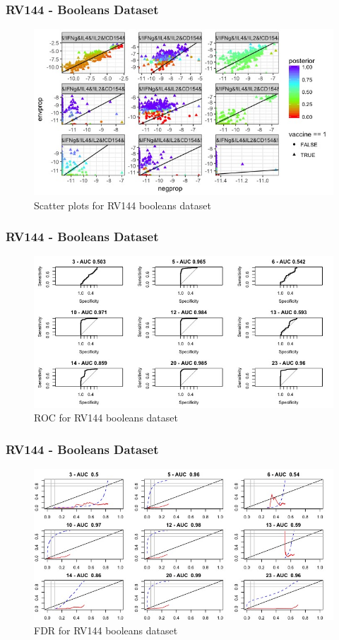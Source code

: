 \documentclass{beamer}
\theoremstyle{definition}
\begin{document}

\begin{frame}
\frametitle{RV144 - Booleans Dataset}
\begin{figure}[]
\includegraphics[width=12 cm]{figures/boolScatterLessWide} \caption{Scatter plots for RV144 booleans dataset}
\end{figure}
\end{frame}


\begin{frame}
\frametitle{RV144 - Booleans Dataset}
\begin{figure}[]
\includegraphics[width=12 cm]{figures/boolROC} \caption{ROC for RV144 booleans dataset}
\end{figure}
\end{frame}


\begin{frame}
\frametitle{RV144 - Booleans Dataset}
\begin{figure}[]
\includegraphics[width=12 cm]{figures/boolFDR} \caption{FDR for RV144 booleans dataset}
\end{figure}
\end{frame}
\end{document}
